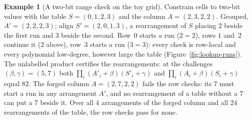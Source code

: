 \documentclass[11pt,a4paper]{article}
\theoremstyle{definition}
\newtheorem{example}[theorem]{Example}
\begin{document}
\begin{example}[A two-bit range check on the toy grid]
\label{ex:arith-lookup-toy}
Constrain cells to two-bit values with the table $S = (0, 1, 2, 3)$ and
the column $A = (2, 3, 2, 2)$. Grouped, $A' = (2, 2, 2, 3)$; align
$S' = (2, 0, 1, 3)$, a rearrangement of $S$ placing $2$ beside the first run
and $3$ beside the second. Row~$0$ starts a run ($2 = 2$), rows $1$
and~$2$ continue it ($2$ above), row~$3$ starts a run ($3 = 3$): every
check is row-local and every polynomial low-degree, however large the
table (Figure~\ref{fig:lookup-runs}). The unlabelled product certifies the
rearrangements: at the challenges $(\beta, \gamma) = (5, 7)$ both
$\prod_i (A'_i + \beta)(S'_i + \gamma)$ and
$\prod_i (A_i + \beta)(S_i + \gamma)$ equal $82$. The forged column
$A = (2, 7, 2, 2)$ fails the row checks: its $7$ must start a run in any
arrangement $A'$, and no rearrangement of a table without a $7$ can put a
$7$ beside it.
Over all $4$ arrangements of the forged column and all $24$
rearrangements of the table, the row checks pass for none.
\end{example}
\end{document}
